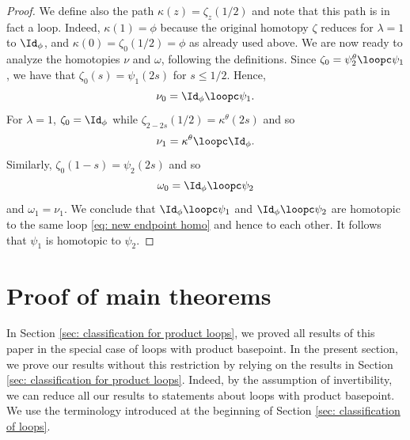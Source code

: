 \begin{proof}
	We define also the path $\kappa(z)=\zeta_{z}(1/2)$ and note that this path is in fact a loop. Indeed, $\kappa(1)=\phi$ because the original homotopy $\zeta$ reduces for $\lambda=1$ to  $\Id_\phi$, and $\kappa(0)=\zeta_0(1/2)=\phi$ as already used above. 
	We are now ready to analyze the homotopies $\nu$ and $\omega$, following the definitions. Since $\zeta_0 = \psi^\theta_2\loopc\psi_1$, we have that $\zeta_0(s) = \psi_1(2s)$ for $s\leq 1/2$. Hence,
	$$
	\nu_0 = \Id_{\phi}\loopc\psi_1.
	$$
	For $\lambda=1$, $\zeta_0 = \Id_{\phi}$ while $\zeta_{2-2s}(1/2) = \kappa^\theta(2s)$ and so
	\begin{equation}\label{eq: new endpoint homo}
		\nu_1 = \kappa^\theta\loopc \Id_{\phi}.
	\end{equation}
	Similarly, $\zeta_0(1-s) = \psi_2(2s)$ and so
	$$
	\omega_0 = \Id_{\phi}\loopc\psi_2
	$$
	and $\omega_1 = \nu_1$. We conclude that $
	\Id_{\phi}\loopc\psi_1 
	$ and $
	\Id_{\phi}\loopc\psi_2 
	$
	are homotopic to the same loop \eqref{eq: new endpoint homo} and hence to each other. It follows that $\psi_1$ is  homotopic to $\psi_2$.
\end{proof}

\section{Proof of main theorems}\label{sec: proofs of main}

In Section \ref{sec: classification for product loops}, we proved all results of this paper in the special case of loops with product basepoint.  In the present section, we prove our results without this restriction by relying on the results in Section \ref{sec: classification for product loops}. Indeed, by the assumption of invertibility, we can reduce all our results to statements about loops with product basepoint. We use the terminology introduced at the beginning of Section \ref{sec: classification of loops}.


